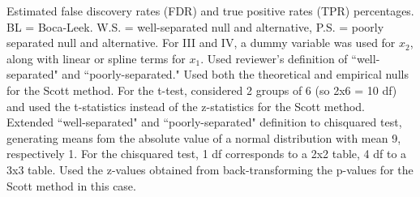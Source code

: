 \documentclass{article}\usepackage[]{graphicx}\usepackage[]{color}
\begin{document}
  
  Estimated false discovery rates (FDR) and true positive rates (TPR) percentages. BL = Boca-Leek. W.S. = well-separated null and alternative, P.S. = poorly separated null and alternative. For III and IV, a dummy variable was used for $x_{2}$, along with linear or spline terms for $x_1$. Used reviewer's definition of ``well-separated" and ``poorly-separated." Used both the theoretical and empirical nulls for the Scott method. For the t-test, considered 2 groups of 6 (so 2x6 = 10 df) and used the t-statistics instead of the z-statistics for the Scott method. Extended ``well-separated" and ``poorly-separated" definition to chisquared test, generating means fom the absolute value of a normal distribution with mean 9, respectively 1. For the chisquared test, 1 df corresponds to a 2x2 table, 4 df to a 3x3 table. Used the z-values obtained from back-transforming the p-values for the Scott method in this case.
\end{document}
